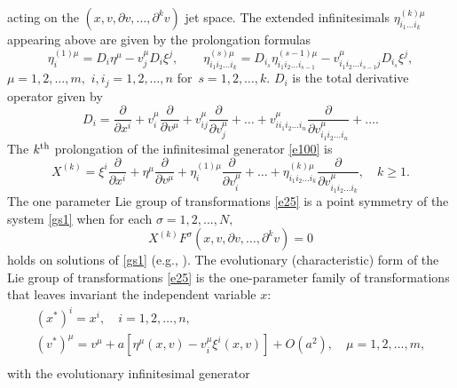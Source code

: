 \documentclass[11pt,letter,subeqn]{article}
\begin{document}
acting on the $(x,v,\partial v,\ldots,\partial^k v)$ jet space. The extended infinitesimals $\eta _{i_1 \ldots i_k }^{(k)\mu}$ appearing above are given by the  prolongation formulas
\begin{equation}\label{ext inf}
 \eta _i^{(1)\mu}  = D_i \eta ^\mu  - v_j^\mu D_i \xi^j , \qquad \eta _{i_1 i_2  \ldots i_k }^{(s)\mu}  = D_{i_s} \eta _{i_1 i_2  \ldots i_{s - 1} }^{(s - 1)\mu}  - v_{i_1 i_2  \ldots i_{s - 1} j}^\mu D_{i_s } \xi^j ,
\end{equation}
 $\mu = 1,2, \ldots ,m,$ $i,i_j  = 1,2, \ldots ,n$ for \,$s = 1,2, \ldots ,k$. $D_i$ is the total derivative operator given by
\begin{equation}\label{DO}
D_i  = \dfrac{\partial }{{\partial x^i }} + v_i^\mu \dfrac{\partial
}{{\partial v^\mu }} + v_{ij}^\mu \dfrac{\partial }{{\partial v_j^\mu }}
+\ldots + v_{ii_1 i_2  \ldots i_n }^\mu \dfrac{\partial
}{{\partial v_{i_1 i_2  \ldots i_n }^\mu }} +  \ldots .
\end{equation}
The $k^{\rm th}$ prolongation of the infinitesimal generator \eqref{e100} is
 \begin{equation}\label{e101}
   X^{(k)} = \xi^i \dfrac{\partial }{{\partial x^i }}
+ \eta ^\mu \dfrac{\partial }{{\partial v^\mu }}+\eta _i^{(1)\mu}\dfrac{\partial}{\partial  v_i^\mu }+\ldots +\eta _{i_1 i_2  \ldots i_k }^{(k)\mu}\dfrac{\partial}{\partial
v^\mu_{i_1 i_2  \ldots i_k}}, \quad k\geq 1.
 \end{equation}
The one parameter Lie group of transformations \eqref{e25} is a point symmetry of the system \eqref{gs1} when for each
$\sigma=1,2,...,N,$
\begin{equation}\label{det:eq:exact}
X^{(k)} F^{\sigma}(x,v,\partial v,\ldots, \partial^k v)=0
\end{equation}
holds on solutions of \eqref{gs1} (e.g., \cite{olver2000applications, bluman2010applications}). The evolutionary (characteristic) form of the Lie group of transformations \eqref{e25} is the one-parameter family of transformations that leaves invariant the
independent variable $x$:
\begin{equation}\label{evol}
\begin{array}{l}
(x^*)^i  =x^i ,\quad i = 1,2, \ldots ,n, \\
(v^*)^\mu  = v^\mu +a [{\eta}^\mu(x,v)-v_i^\mu \xi^i(x,v)]+ O(a^2),\quad \mu = 1,2, \ldots ,m, \\
\end{array}
\end{equation}
with the evolutionary infinitesimal generator
\end{document}
